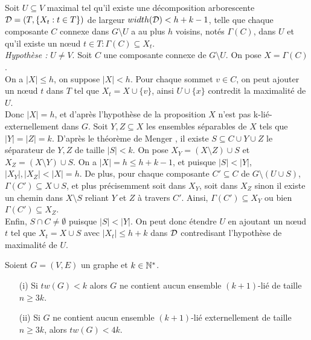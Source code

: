 	Soit $U \subseteq V$ maximal tel qu'il existe une décomposition
	arborescente ${\cal D} = (T,\{X_t : t \in T\})$ de largeur 
	$width({\cal D}) < h + k - 1$,
	telle que chaque composante $C$ connexe dans $G \setminus U$ a 
	au plus $h$ voisins, notés $\Gamma(C)$, dans $U$ et qu'il
	existe un n\oe ud $t \in T : \Gamma(C) \subseteq X_t$.
	\\
	{\em Hypothèse :} $U \neq V$.
	Soit $C$ une composante connexe de $G \setminus U$.
	On pose $X = \Gamma(C)$.
	\\
	On a $|X| \leq h$, on suppose $|X| < h$.
	Pour chaque sommet $v \in C$, on peut ajouter un n\oe ud $t$ dans
	$T$ tel que $X_t = X \cup \{v\}$, ainsi $U \cup \{x\}$ 
	contredit la maximalité de $U$.
	\\
	Donc $|X| = h$, et d'après l'hypothèse de la proposition
	$X$ n'est pas k-lié-externellement dans $G$.
	Soit $Y,Z \subseteq X$ les ensembles séparables de $X$ tels que
	$|Y| = |Z| = k$.
	D'après le théorème de Menger \cite{thmenger}, il existe
	$S \subseteq C \cup Y \cup Z$ le séparateur de $Y,Z$ de taille $|S| < k$.
	On pose $X_Y = (X\setminus Z) \cup S$ et $X_Z = (X \setminus Y) \cup S$.
	On a $|X| = h \leq h + k -1$, et puisque $|S| < |Y|$, $|X_Y|,|X_Z| < |X| = h$.
	De plus, pour chaque composante $C' \subseteq C$ de $G \setminus (U\cup S)$,
	$\Gamma(C') \subseteq X \cup S$, et plus précisemment soit dans $X_Y$, soit dans
	$X_Z$ sinon il existe un chemin dans $X \setminus S$ reliant $Y$ et $Z$ à travers
	$C'$.
	Ainsi, $\Gamma(C') \subseteq X_Y$ ou bien $\Gamma(C') \subseteq X_Z$.
	\\
	Enfin, $S \cap C \neq \emptyset$ puisque $|S| < |Y|$.
	On peut donc étendre $U$ en ajoutant un n\oe ud $t$ tel que
	$X_t = X \cup S$ avec $|X_t| \leq h + k$ dans ${\cal D}$ contredisant l'hypothèse de maximalité
	de $U$.
	
\label{propdiestel}
	Soient $G = (V,E)$ un graphe et $k \in \mathbb{N}^*$.
	\begin{itemize}
		\item[(i)] Si $tw(G) < k$ alors $G$ ne contient aucun ensemble
		$(k+1)$-lié de taille $n \geq 3k$.
		\item[(ii)] Si $G$ ne contient aucun ensemble $(k+1)$-lié externellement
		de taille $n \geq 3k$, alors $tw(G) < 4k$.
	\end{itemize}

